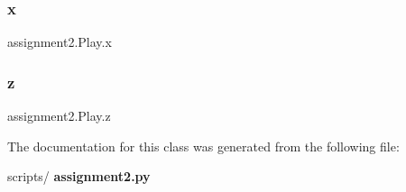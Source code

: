 \subsubsection{x}
{\footnotesize\ttfamily assignment2.\+Play.\+x\hspace{0.3cm}{\ttfamily [static]}}

\mbox{\label{classassignment2_1_1_play_a57ad0312f0832121b0579dc0d681cc24}} 
\subsubsection{z}
{\footnotesize\ttfamily assignment2.\+Play.\+z\hspace{0.3cm}{\ttfamily [static]}}



The documentation for this class was generated from the following file\+:\begin{DoxyCompactItemize}
\item 
scripts/\textbf{ assignment2.\+py}\end{DoxyCompactItemize}
